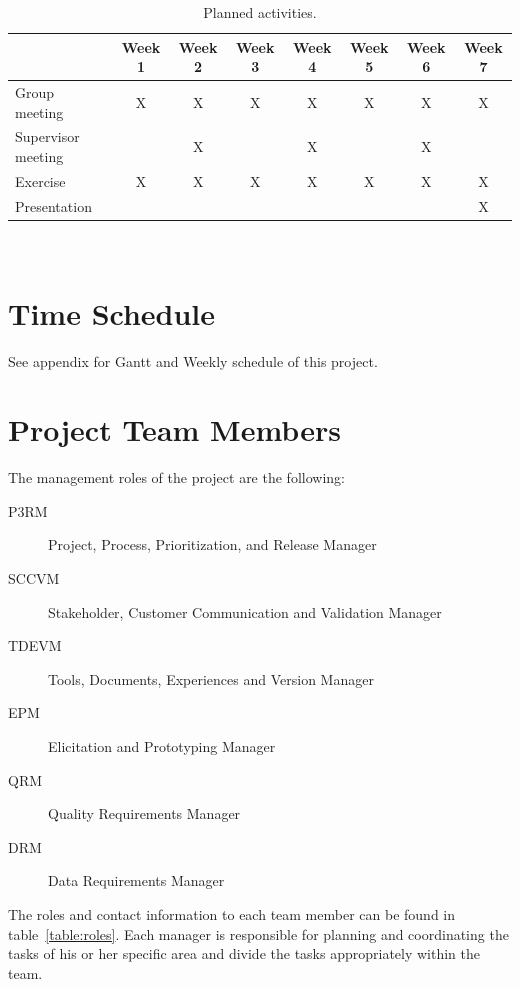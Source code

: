 \documentclass[10pt,a4paper]{article}
\begin{document}
\begin{table}[h!]
\centering
\caption{Planned activities.}
\label{table:meet}
\begin{tabular}{|l|c|c|c|c|c|c|c|} \hline
&Week 1 & Week 2 & Week 3 & Week 4 & Week 5 & Week 6 & Week 7\\ \hline
Group meeting & X &X&X&X&X&X&X\\ \hline
Supervisor meeting &&X&&X&&X&\\ \hline
Exercise & X &X&X&X&X&X&X\\ \hline
Presentation &&&&&&&X\\ \hline 
\end{tabular}\\
\end{table}


\section{Time Schedule}
See appendix for Gantt and Weekly schedule of this project.


\section{Project Team Members}
The management roles of the project are the following:

\begin{description}
\item[P3RM] Project, Process, Prioritization, and Release Manager
\item[SCCVM] Stakeholder, Customer Communication and Validation Manager
\item[TDEVM] Tools, Documents, Experiences and Version Manager 
\item[EPM] Elicitation and Prototyping Manager
\item[QRM] Quality Requirements Manager
\item[DRM] Data Requirements Manager
\end{description}

The roles and contact information to each team member can be found in table~\ref{table:roles}. Each manager is responsible for planning and coordinating the tasks of his or her specific area and divide the tasks appropriately within the team.
\end{document}

